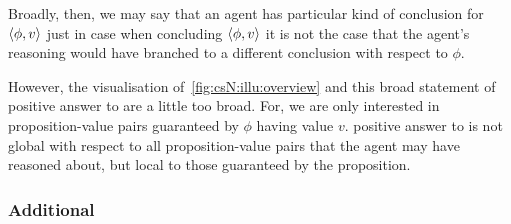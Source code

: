 \begin{note}
  Broadly, then, we may say that an agent has {\color{red} particular kind of conclusion} for \(\langle \phi, v \rangle\) just in case when concluding \(\langle \phi, v \rangle\) it is not the case that the agent's reasoning would have branched to a different conclusion with respect to \(\phi\).

  However, the visualisation of~\autoref{fig:csN:illu:overview} and this broad statement of {\color{red} positive answer to \qzS{}} are a little too broad.
  For, we are only interested in proposition-value pairs guaranteed by \(\phi\) having value \(v\).
  {\color{red} positive answer to \qzS{}} is not global with respect to all proposition-value pairs that the agent may have reasoned about, but local to those guaranteed by the proposition.
\end{note}

\subsubsection{Additional }
\label{cha:zS:sec:question:illu:additional}

